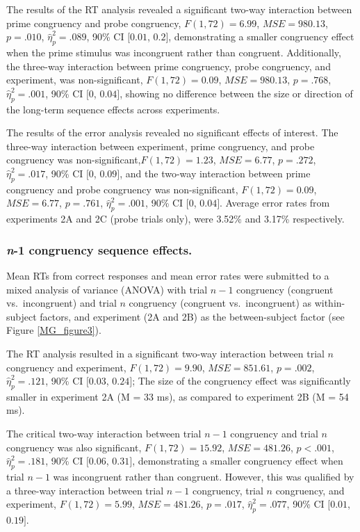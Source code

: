 \documentclass[]{DissertateCUNY}
\begin{document}
The results of the RT analysis revealed a significant two-way
interaction between prime congruency and probe congruency,
\(F(1, 72) = 6.99\), \(\mathit{MSE} = 980.13\), \(p = .010\),
\(\hat{\eta}^2_p = .089\), 90\% CI \([0.01\), \(0.2]\), demonstrating a
smaller congruency effect when the prime stimulus was incongruent rather
than congruent. Additionally, the three-way interaction between prime
congruency, probe congruency, and experiment, was non-significant,
\(F(1, 72) = 0.09\), \(\mathit{MSE} = 980.13\), \(p = .768\),
\(\hat{\eta}^2_p = .001\), 90\% CI \([0\), \(0.04]\), showing no
difference between the size or direction of the long-term sequence
effects across experiments.

The results of the error analysis revealed no significant effects of
interest. The three-way interaction between experiment, prime
congruency, and probe congruency was
non-significant,\(F(1, 72) = 1.23\), \(\mathit{MSE} = 6.77\),
\(p = .272\), \(\hat{\eta}^2_p = .017\), 90\% CI \([0\), \(0.09]\), and
the two-way interaction between prime congruency and probe congruency
was non-significant, \(F(1, 72) = 0.09\), \(\mathit{MSE} = 6.77\),
\(p = .761\), \(\hat{\eta}^2_p = .001\), 90\% CI \([0\), \(0.04]\).
Average error rates from experiments 2A and 2C (probe trials only), were
3.52\% and 3.17\% respectively.

\hypertarget{congruency-sequence-effects.-2}{%
\subsubsection{\texorpdfstring{\textit{n}-1 congruency sequence
effects.}{-1 congruency sequence effects.}}\label{congruency-sequence-effects.-2}}

Mean RTs from correct responses and mean error rates were submitted to a
mixed analysis of variance (ANOVA) with trial \(n-1\) congruency
(congruent vs.~incongruent) and trial \(n\) congruency (congruent
vs.~incongruent) as within-subject factors, and experiment (2A and 2B)
as the between-subject factor (see Figure \ref{MG_figure3}).

The RT analysis resulted in a significant two-way interaction between
trial \(n\) congruency and experiment, \(F(1, 72) = 9.90\),
\(\mathit{MSE} = 851.61\), \(p = .002\), \(\hat{\eta}^2_p = .121\), 90\%
CI \([0.03\), \(0.24]\); The size of the congruency effect was
significantly smaller in experiment 2A (M = 33 ms), as compared to
experiment 2B (M = 54 ms).

The critical two-way interaction between trial \(n-1\) congruency and
trial \(n\) congruency was also significant, \(F(1, 72) = 15.92\),
\(\mathit{MSE} = 481.26\), \(p < .001\), \(\hat{\eta}^2_p = .181\), 90\%
CI \([0.06\), \(0.31]\), demonstrating a smaller congruency effect when
trial \(n-1\) was incongruent rather than congruent. However, this was
qualified by a three-way interaction between trial \(n-1\) congruency,
trial \(n\) congruency, and experiment, \(F(1, 72) = 5.99\),
\(\mathit{MSE} = 481.26\), \(p = .017\), \(\hat{\eta}^2_p = .077\), 90\%
CI \([0.01\), \(0.19]\).
\end{document}
